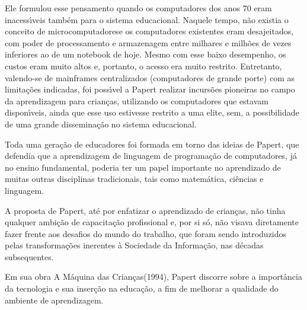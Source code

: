 \documentclass[
12pt,		%
openright,	%
twoside,  %
a4paper,			%
chapter=TITLE,		%
english,			%
french,				%
spanish,			%
brazil				%
]{USPSC-classe/USPSC}
\begin{document}
Ele formulou esse pensamento quando os computadores dos anos 70 eram inacess\'{\i}veis tamb\'em para o sistema educacional. Naquele tempo, n\~ao existia o conceito de \textquotedbl microcomputadores\textquotedbl  e os computadores existentes eram desajeitados, com poder de processamento e armazenagem entre milhares e milh\~oes de vezes inferiores ao de um notebook de hoje. Mesmo com esse baixo desempenho, os custos eram muito altos e, portanto, o acesso era muito restrito. Entretanto, valendo-se de mainframes centralizados (computadores de grande porte) com as limita\c{c}\~oes indicadas, foi poss\'{\i}vel a Papert realizar incurs\~oes pioneiras no campo da aprendizagem para crian\c{c}as, utilizando os computadores que estavam dispon\'{\i}veis, ainda que esse uso estivesse restrito a uma elite, sem, a possibilidade de uma grande dissemina\c{c}\~ao no sistema educacional.










Toda uma gera\c{c}\~ao de educadores foi formada em torno das ideias de Papert, que defendia que a aprendizagem de linguagem de programa\c{c}\~ao de computadores, j\'a no ensino fundamental, poderia ter um papel importante no aprendizado de muitas outras disciplinas tradicionais, tais como matem\'atica, ci\^encias e linguagem.










A proposta de Papert, at\'e por enfatizar o aprendizado de crian\c{c}as, n\~ao tinha qualquer ambi\c{c}\~ao de capacita\c{c}\~ao profissional e, por si s\'o, n\~ao visava diretamente fazer frente aos desafios do \textquotedbl mundo do trabalho\textquotedbl , que foram sendo introduzidos pelas transforma\c{c}\~oes inerentes \`a Sociedade da Informa\c{c}\~ao, nas d\'ecadas subsequentes.










Em sua obra \textquotedbl A M\'aquina das Crian\c{c}as\textquotedbl  (1994), Papert discorre sobre a import\^ancia da tecnologia e sua inser\c{c}\~ao na educa\c{c}\~ao, a fim de melhorar a qualidade do ambiente de aprendizagem.
\end{document}
